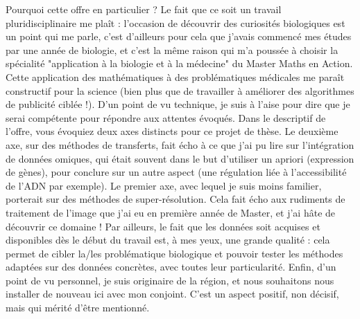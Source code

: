 \documentclass[a4paper,12pt]{article}
\begin{document}
Pourquoi cette offre en particulier ? Le fait que ce soit un travail pluridisciplinaire me plaît : l'occasion de découvrir des curiosités biologiques est un point qui me parle, c'est d'ailleurs pour cela que j'avais commencé mes études par une année de biologie, et c'est la même raison qui m'a poussée à choisir la spécialité "application à la biologie et à la médecine" du Master Maths en Action. Cette application des mathématiques à des problématiques médicales me paraît constructif pour la science (bien plus que de travailler à améliorer des algorithmes de publicité ciblée !). 
D'un point de vu technique, je suis à l'aise pour dire que je serai compétente pour répondre aux attentes évoqués. Dans le descriptif de l'offre, vous évoquiez deux axes distincts pour ce projet de thèse. Le deuxième axe, sur des méthodes de transferts, fait écho à ce que j'ai pu lire sur l'intégration de données omiques, qui était souvent dans le but d'utiliser un apriori (expression de gènes), pour conclure sur un autre aspect (une régulation liée à l'accessibilité de l'ADN par exemple). Le premier axe, avec lequel je suis moins familier, porterait sur des méthodes de super-résolution. Cela fait écho aux rudiments de traitement de l'image que j'ai eu en première année de Master, et j'ai hâte de découvrir ce domaine !%
%
Par ailleurs, le fait que les données soit acquises et disponibles dès le début du travail est, à mes yeux, une grande qualité : cela permet de cibler la/les problématique biologique et pouvoir tester les méthodes adaptées sur des données concrètes, avec toutes leur particularité.
Enfin, d'un point de vu personnel, je suis originaire de la région, et nous souhaitons nous installer de nouveau ici avec mon conjoint. C'est un aspect positif, non décisif, mais qui mérité d'être mentionné. 
\\



\end{document}
